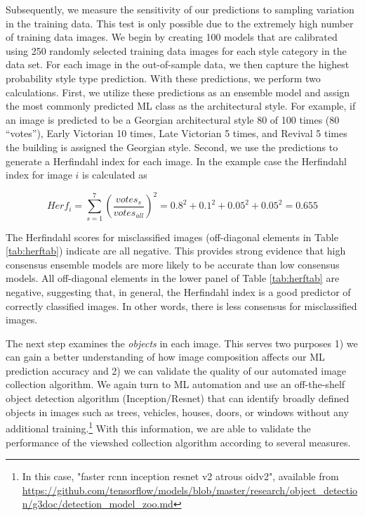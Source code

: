 \documentclass[]{article}
\begin{document}
Subsequently, we measure the sensitivity of our predictions to sampling variation in the training data. This test is only possible due to the extremely high number of training data images. We begin by creating 100 models that are calibrated using 250 randomly selected training data images for each style category in the data set. For each image in the out-of-sample data, we then capture the highest probability style type prediction. With these predictions, we perform two calculations. First, we utilize these predictions as an ensemble model and assign the most commonly predicted ML class as the architectural style. For example, if an image is predicted to be a Georgian architectural style 80 of 100 times (80 ``votes''), Early Victorian 10 times, Late Victorian 5 times, and Revival 5 times the building is assigned the Georgian style. Second, we use the predictions to generate a Herfindahl index for each image. In the example case the Herfindahl index for image $i$ is calculated as 

\begin{equation}\label{eq:herf}
Herf_{i} = \sum_{s=1}^{7}\left(\frac{votes_{s}}{votes_{all}}\right)^{2} = 0.8^2 + 0.1^2 + 0.05^2 + 0.05^2 = 0.655
\end{equation}

The Herfindahl scores for misclassified images (off-diagonal elements in Table \ref{tab:herftab}) indicate are all negative. This provides strong evidence that high consensus ensemble models are more likely to be accurate than low consensus models. All off-diagonal elements in the lower panel of Table \ref{tab:herftab} are negative, suggesting that, in general, the Herfindahl index is a good predictor of correctly classified images. In other words, there is less consensus for misclassified images.

The next step examines the \emph{objects} in each image. This serves two purposes 1) we can gain a better understanding of how image composition affects our ML prediction accuracy and 2) we can validate the quality of our automated image collection algorithm. We again turn to ML automation and use an off-the-shelf object detection algorithm (Inception/Resnet) that can identify broadly defined objects in images such as trees, vehicles, houses, doors, or windows without any additional training.\footnote{In this case, "faster rcnn inception resnet v2 atrous oidv2", available from \url{https://github.com/tensorflow/models/blob/master/research/object_detection/g3doc/detection_model_zoo.md}} With this information, we are able to validate the performance of the viewshed collection algorithm according to several measures. 
\end{document}

